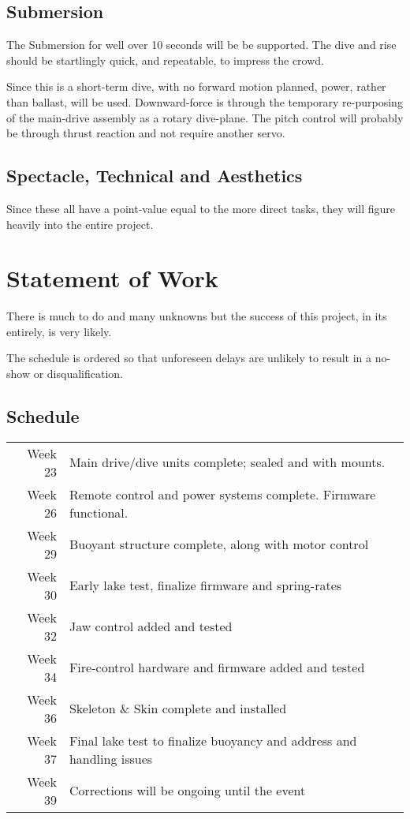 \documentclass[]{article}
\begin{document}
\subsection{Submersion}
The Submersion for well over 10 seconds will be be supported.
The dive and rise should be startlingly quick, and repeatable, to impress the crowd.

Since this is a short-term dive, with no forward motion planned, power, rather than ballast, will be used. Downward-force is through the temporary re-purposing of the main-drive assembly as a rotary dive-plane. The pitch control will probably be through thrust reaction and not require another servo.

\subsection{Spectacle, Technical and Aesthetics}
Since these all have a point-value equal to the more direct tasks, they will figure heavily into the entire project.


\section{Statement of Work}
There is much to do and many unknowns but the success of this project, in its entirely, is very likely.

The schedule is ordered so that unforeseen delays are unlikely to result in a no-show or disqualification.

\subsection{Schedule}
\begin{tabular}{ r p{} }
 \\ Week 23 & Main drive/dive units complete; sealed and with mounts.
 \\ Week 26 & Remote control and power systems complete. Firmware functional.
 \\ Week 29 & Buoyant structure complete, along with motor control
 \\ Week 30 & Early lake test, finalize firmware and spring-rates 
 \\ Week 32 & Jaw control added and tested
 \\ Week 34 & Fire-control hardware and firmware added and tested
 \\ Week 36 & Skeleton \& Skin complete and installed
 \\ Week 37 & Final lake test to finalize buoyancy and address and handling issues
 \\ Week 39 & Corrections will be ongoing until the event
\end{tabular}
\end{document}

